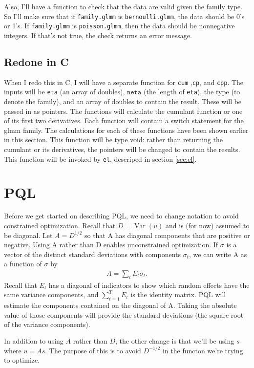 \documentclass{article}
\DeclareMathOperator{\var}{Var}
\begin{document}
Also, I'll have a function to check that the data are valid given the family type. So I'll make sure that if \texttt{family.glmm} is \texttt{bernoulli.glmm}, the data should be 0's or 1's. If \texttt{family.glmm} is \texttt{poisson.glmm}, then the data should be nonnegative integers.  If that's not true, the check returns an error message. 

\subsection{Redone in C}
When I redo this in C, I will have a separate function for \texttt{cum} ,\texttt{cp}, and \texttt{cpp}. The inputs will be \texttt{eta} (an array of doubles), $\texttt{neta}$ (the length of \texttt{eta}), the type (to denote the family), and an array of doubles to contain the result. These will be passed in as pointers. The functions will calculate  the cumulant function or one of its first two derivatives. Each function will contain a switch statement for the glmm family. The calculations for each of these functions have  been shown earlier in this section. This function will be type void: rather than returning the cumulant or its derivatives, the pointers will be changed to contain the results. This function will be invoked by \texttt{el}, descriped in section \ref{sec:el}.


\section{PQL}\label{sec:pql}
 Before we get started on describing PQL, we need to change notation to avoid constrained optimization.  Recall that $D=\var(u)$ and is (for now) assumed to be diagonal. Let $A=D^{1/2}$ so that A has diagonal components that are positive or negative. Using A rather than D enables unconstrained optimization.  If $\sigma$ is a vector of the distinct standard deviations with components $\sigma_t$, we can write A as a function of $\sigma$ by
\begin{align*}
A= \sum_t E_t \sigma_t.
\end{align*}
Recall that $E_t$ has a diagonal of indicators to show which random effects have the same variance components, and $\sum_{t=1}^T E_t$ is the identity matrix. PQL will estimate the components contained on the diagonal of A. Taking the absolute value of those components will provide the standard deviations (the square root of the variance components).

In addition to using $A$ rather than $D$, the other change is that we'll be using $s$ where $u=As$. The purpose of this is to avoid $D^{-1/2}$ in the functon we're trying to optimize.
\end{document}
